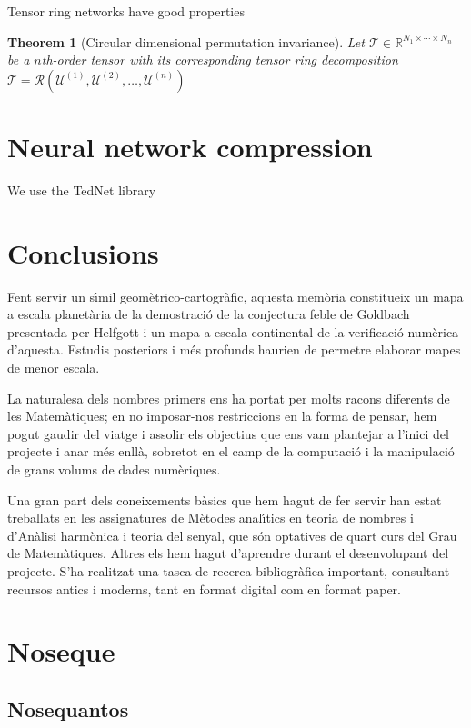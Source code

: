 \documentclass[11pt,a4paper,openright,oneside]{book}
\numberwithin{equation}{section}
\newtheorem{thm0}[defn0]{Theorem}
\newenvironment{theorem}{\bigskip \begin{thm0}}{\end{thm0}}
\begin{document}
Tensor ring networks have good properties \cite{zhaoTensorRingDecomposition2016}

\begin{theorem} [Circular dimensional permutation invariance] Let $\mathcal{T} \in \mathbb{R}^{N_1 \times \cdots \times N_n}$ be
    a $n$th-order tensor with its corresponding tensor ring decomposition $\mathcal{T} = \mathcal{R}(\mathcal{U}^{(1)}, \mathcal{U}^{(2)}, \dots, \mathcal{U}^{(n)})$

    
\end{theorem}

\chapter{Neural network compression}

We use the TedNet library \cite{panTedNetPytorchToolkit2022}

\chapter{Conclusions}

Fent servir un s\'{\i}mil geom\`etrico-cartogr\`afic, aquesta mem\`oria constitueix un mapa a escala planet\`aria de la demostraci\'o de la conjectura feble de Goldbach presentada per Helfgott i un mapa a escala continental de la verificaci\'o num\`erica d'aquesta. Estudis posteriors i m\'es profunds haurien de permetre elaborar mapes de menor escala.

La naturalesa dels nombres primers ens ha portat per molts racons diferents de les Matem\`atiques; en no imposar-nos restriccions en la forma de pensar, hem pogut gaudir del viatge i assolir els objectius que ens vam plantejar a l'inici del projecte i anar m\'es enll\`a, sobretot en el camp de la computaci\'o i la manipulaci\'o de grans volums de dades num\`eriques.

Una gran part dels coneixements b\`asics que hem hagut de fer servir han estat treballats en les assignatures de M\`etodes anal\'{\i}tics en teoria de nombres i d'An\`alisi harm\`onica i teoria del senyal, que s\'on optatives de quart curs del Grau de Ma\-te\-m\`a\-ti\-ques. Altres els hem hagut d'aprendre durant el desenvolupant del projecte. S'ha realitzat una tasca de recerca bibliogr\`afica important, consultant recursos antics i moderns, tant en format digital com en format paper.

\normalfont


\newpage

\printbibliography

\appendix
\chapter{Noseque}
\section{Nosequantos}
\end{document}
